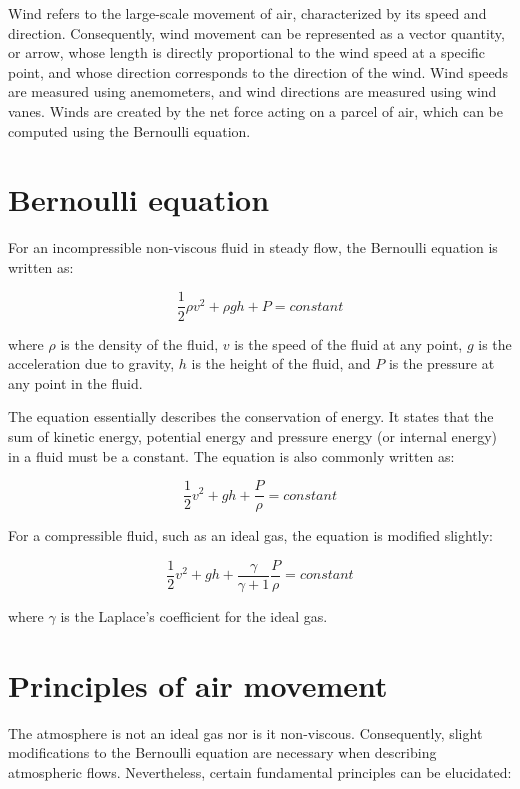 \documentclass[
  12 pt,
]{Nemilov}
\begin{document}
Wind refers to the large-scale movement of air, characterized by its speed and direction. Consequently, wind movement can be represented as a vector quantity, or arrow, whose length is directly proportional to the wind speed at a specific point, and whose direction corresponds to the direction of the wind. Wind speeds are measured using anemometers, and wind directions are measured using wind vanes. Winds are created by the net force acting on a parcel of air, which can be computed using the Bernoulli equation.

\section{Bernoulli equation}\label{bernoulli-equation}

For an incompressible non-viscous fluid in steady flow, the Bernoulli equation is written as:

\[\frac{1}{2}\rho v^{2} + \rho gh + P = constant\]

where \(\rho\) is the density of the fluid, \(v\) is the speed of the fluid at any point, \(g\) is the acceleration due to gravity, \(h\) is the height of the fluid, and \(P\) is the pressure at any point in the fluid.

The equation essentially describes the conservation of energy. It states that the sum of kinetic energy, potential energy and pressure energy (or internal energy) in a fluid must be a constant. The equation is also commonly written as:

\[\frac{1}{2} v^{2} + gh + \frac{P}{\rho} = constant\]

For a compressible fluid, such as an ideal gas, the equation is modified slightly:

\[\frac{1}{2} v^{2} + gh + \frac{\gamma}{\gamma + 1} \frac{P}{\rho} = constant\]

where \(\gamma\) is the Laplace's coefficient for the ideal gas.

\section{Principles of air movement}\label{principles-of-air-movement}

The atmosphere is not an ideal gas nor is it non-viscous. Consequently, slight modifications to the Bernoulli equation are necessary when describing atmospheric flows. Nevertheless, certain fundamental principles can be elucidated:
\end{document}
